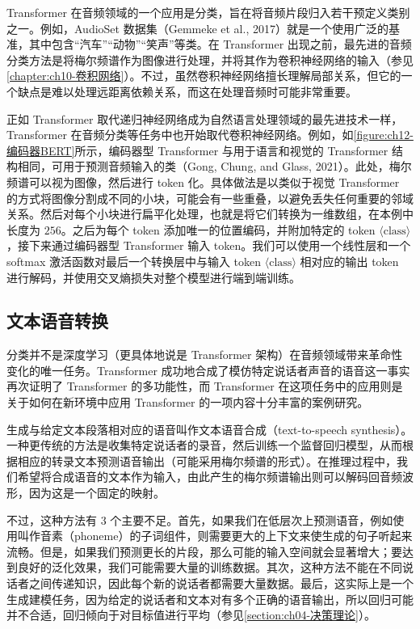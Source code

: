 \documentclass[../../main.tex]{subfiles}
\begin{document}
Transformer 在音频领域的一个应用是分类，旨在将音频片段归入若干预定义类别之一。例如，AudioSet 数据集（Gemmeke et al., 2017）就是一个使用广泛的基准，其中包含“汽车”“动物”“笑声”等类。在 Transformer 出现之前，最先进的音频分类方法是将梅尔频谱作为图像进行处理，并将其作为卷积神经网络的输入（参见\cref{chapter:ch10-卷积网络}）。不过，虽然卷积神经网络擅长理解局部关系，但它的一个缺点是难以处理远距离依赖关系，而这在处理音频时可能非常重要。

正如 Transformer 取代递归神经网络成为自然语言处理领域的最先进技术一样，Transformer 在音频分类等任务中也开始取代卷积神经网络。例如，如\cref{figure:ch12-编码器BERT}所示，编码器型 Transformer 与用于语言和视觉的 Transformer 结构相同，可用于预测音频输入的类（Gong, Chung, and Glass, 2021）。此处，梅尔频谱可以视为图像，然后进行 token 化。具体做法是以类似于视觉 Transformer 的方式将图像分割成不同的小块，可能会有一些重叠，以避免丢失任何重要的邻域关系。然后对每个小块进行扁平化处理，也就是将它们转换为一维数组，在本例中长度为 $256$。之后为每个 token 添加唯一的位置编码，并附加特定的 token $\langle\mathrm{class}\rangle$，接下来通过编码器型 Transformer 输入 token。我们可以使用一个线性层和一个 softmax 激活函数对最后一个转换层中与输入 token $\langle\mathrm{class}\rangle$ 相对应的输出 token 进行解码，并使用交叉熵损失对整个模型进行端到端训练。

\subsection{文本语音转换}\label{subsection:ch12-文本语音转换}

分类并不是深度学习（更具体地说是 Transformer 架构）在音频领域带来革命性变化的唯一任务。Transformer 成功地合成了模仿特定说话者声音的语音这一事实再次证明了 Transformer 的多功能性，而 Transformer 在这项任务中的应用则是关于如何在新环境中应用 Transformer 的一项内容十分丰富的案例研究。

生成与给定文本段落相对应的语音叫作文本语音合成（text-to-speech synthesis）。一种更传统的方法是收集特定说话者的录音，然后训练一个监督回归模型，从而根据相应的转录文本预测语音输出（可能采用梅尔频谱的形式）。在推理过程中，我们希望将合成语音的文本作为输入，由此产生的梅尔频谱输出则可以解码回音频波形，因为这是一个固定的映射。

不过，这种方法有 3 个主要不足。首先，如果我们在低层次上预测语音，例如使用叫作音素（phoneme）的子词组件，则需要更大的上下文来使生成的句子听起来流畅。但是，如果我们预测更长的片段，那么可能的输入空间就会显著增大；要达到良好的泛化效果，我们可能需要大量的训练数据。其次，这种方法不能在不同说话者之间传递知识，因此每个新的说话者都需要大量数据。最后，这实际上是一个生成建模任务，因为给定的说话者和文本对有多个正确的语音输出，所以回归可能并不合适，回归倾向于对目标值进行平均（参见\cref{section:ch04-决策理论}）。
\end{document}

